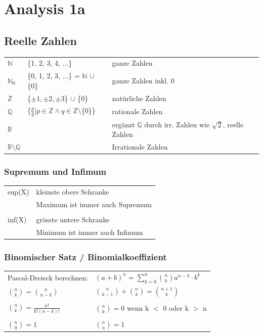 \section{Analysis 1a}

    \subsection{Reelle Zahlen}
	
		\begin{tabular}{l l l}
			$\mathbb{N}$  & \{1, 2, 3, 4, ...\} & ganze Zahlen \\
			$\mathbb{N}_0$ & \{0, 1, 2, 3, ...\} = $\mathbb{N}$ $\cup$ \{0\} & ganze Zahlen inkl. 0 \\
			$\mathbb{Z}$ & \{$\pm1, \pm2, \pm3 $\} $\cup$ \{0\} & natürliche Zahlen \\
			$\mathbb{Q}$ & \{$ \frac{p}{q} | p \in \mathbb{Z} \wedge q \in \mathbb{Z} \setminus $\{0\}\} & rationale Zahlen \\
			$\mathbb{R}$ & & ergänzt $\mathbb{Q}$ durch irr. Zahlen wie $\sqrt{2}$, reelle Zahlen \\
			$\mathbb{R} \setminus \mathbb{Q}$ & & Irrationale Zahlen \\
		\end{tabular}

		\subsubsection{Supremum und Infimum}
			\begin{tabular}{ll} 
				sup(X) & kleinste obere Schranke  \\
				       & Maximum ist immer auch Supremum \\
				\\
				inf(X) &  grösste untere Schranke \\ 
				       & Minimum ist immer auch Infimum \\
			\end{tabular}			
				
		\subsubsection{Binomischer Satz / Binomialkoeffizient}	
			\begin{tabular}{ll} 
				Pascal-Dreieck berechnen:  & $\left(a+b\right)^n = \sum\limits _{k=0}^n \binom{n}{k}a^{n-k}\cdot b^k$ \\
				$\binom{n}{k}=\binom{n}{n-k}$ & $\binom{n}{k-1}+\binom{n}{k}=\binom{n+1}{k}$ \\
				\\
				$\binom{n}{k}=\frac{n!}{k!\left(n-k\right)!}$ & $\binom{n}{k} = 0$ wenn k $<$ 0 oder k $>$ n \\ 
				\\
				$\binom{n}{0}=1$ &  $\binom{n}{n}=1$ \\ 	 		
			\end{tabular}				 
				 
